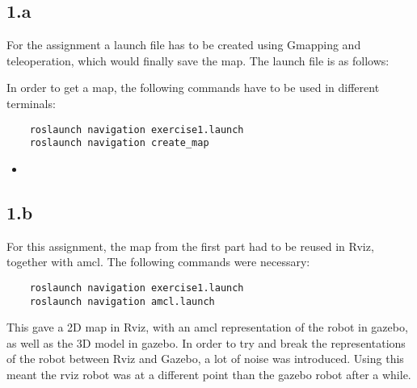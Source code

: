 
\subsection*{1.a}
For the assignment a launch file has to be created using Gmapping and teleoperation, which would finally save the map. The launch file is as follows:



In order to get a map, the following commands have to be used in different terminals:

\begin{lstlisting}
	roslaunch navigation exercise1.launch
	roslaunch navigation create_map
\end{lstlisting}

\begin{itemize}
	\item {}
\end{itemize}



\subsection*{1.b}


For this assignment, the map from the first part had to be reused in Rviz, together with amcl. The following commands were necessary:

\begin{lstlisting}
	roslaunch navigation exercise1.launch
	roslaunch navigation amcl.launch
\end{lstlisting}

This gave a 2D map in Rviz, with an amcl representation of the robot in gazebo, as well as the 3D model in gazebo. In order to try and break the representations of the robot between Rviz and Gazebo, a lot of noise was introduced. Using this meant the rviz robot was at a different point than the gazebo robot after a while.



